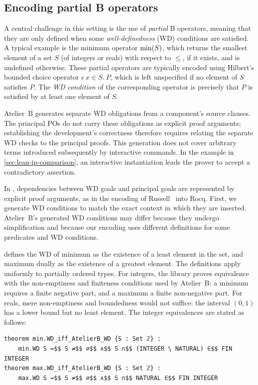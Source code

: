 \subsection{Encoding partial B operators}
\label{sec:partial-operators}
A central challenge in this setting is the use of \emph{partial} B operators, meaning that they are only defined when some \emph{well-definedness} (WD) conditions are satisfied.
A typical example is the minimum operator $\operatorname{min}(S)$, which returns the smallest element of a set $S$ (of integers or reals) with respect to $\le$, if it exists, and is undefined otherwise.
These partial operators are typically encoded using Hilbert's bounded choice operator $\epsilon\ x \in S.\ P$, which is left unspecified if no element of $S$ satisfies $P$.
The \emph{WD condition} of the corresponding operator is precisely that $P$ is satisfied by at least one element of $S$.



Atelier~B generates separate WD obligations from a component's source clauses.
The principal POs do not carry these obligations as explicit proof arguments; establishing the development's correctness therefore requires relating the separate WD checks to the principal proofs.
This generation does not cover arbitrary terms introduced subsequently by interactive commands.
In the example in \cref{sec:lean-ip-comparison}, an interactive instantiation leads the prover to accept a contradictory assertion.

In \barrel, dependencies between WD goals and principal goals are represented by explicit proof arguments, as in the encoding of Russell~\cite{sozeau:2006} into Rocq.
%
First, we generate WD conditions to match the exact context in which they are inserted.
Atelier~B's generated WD conditions may differ because they undergo simplification and because our encoding uses different definitions for some predicates and WD conditions.



\begin{remark}
	\barrel defines the WD of minimum as the existence of a least element in the set, and maximum dually as the existence of a greatest element.
	The definitions apply uniformly to partially ordered types.
	For integers, the library proves equivalence with the non-emptiness and finiteness conditions used by Atelier~B: a minimum requires a finite negative part, and a maximum a finite non-negative part.
	For reals, mere non-emptiness and boundedness would not suffice: the interval $(0,1)$ has a lower bound but no least element.
	The integer equivalences are stated as follows:
	\begin{lstlisting}[language=lean]
theorem min.WD_iff_AtelierB_WD {S : Set ℤ} :
	min.WD S ↔$$ S ≠$$ ∅$$ ∧$$ S ∩$$ (INTEGER \ NATURAL) ∈$$ FIN INTEGER
theorem max.WD_iff_AtelierB_WD {S : Set ℤ} :
	max.WD S ↔$$ S ≠$$ ∅$$ ∧$$ S ∩$$ NATURAL ∈$$ FIN INTEGER
\end{lstlisting}
\end{remark}


